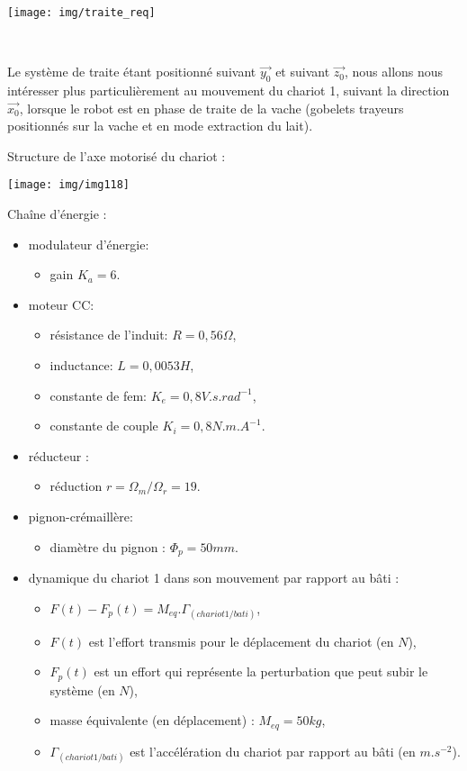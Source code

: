 \begin{center}
 \texttt{[image: img/traite\_req]}
\end{center}

~\

Le système de traite étant positionné suivant $\overrightarrow{y_0}$ et suivant $\overrightarrow{z_0}$, nous allons nous intéresser plus particulièrement au mouvement du chariot 1, suivant la direction $\overrightarrow{x_0}$, lorsque le robot est en phase de traite de la vache (gobelets trayeurs positionnés sur la vache et en mode extraction du lait).

\newpage

Structure de l'axe motorisé du chariot :

\begin{center}
 \texttt{[image: img/img118]}
\end{center}

Chaîne d'énergie :
\begin{itemize}
 \item modulateur d'énergie:
 \begin{itemize}
  \item gain $K_a=6$.
 \end{itemize}
 \item moteur CC:
  \begin{itemize}
  \item résistance de l'induit: $R=0,56\Omega$,
  \item inductance: $L=0,0053 H$,
  \item constante de fem: $K_e=0,8V.s.rad^{-1}$,
  \item constante de couple $K_i=0,8N.m.A^{-1}$.
 \end{itemize}
 \item réducteur :
  \begin{itemize}
  \item réduction $r=\Omega_m/\Omega_r=19$.
  \end{itemize}
 \item pignon-crémaillère:
  \begin{itemize}
  \item diamètre du pignon : $\Phi_p=50mm$.
  \end{itemize}
 \item dynamique du chariot 1 dans son mouvement par rapport au bâti :
  \begin{itemize}
  \item $F(t)-F_p(t)=M_{eq}.\Gamma_{(chariot 1/bati)}$,
  \item $F(t)$ est l'effort transmis pour le déplacement du chariot (en $N$),
  \item $F_p(t)$ est un effort qui représente la perturbation que peut subir le système (en $N$),
  \item masse équivalente (en déplacement) : $M_{eq}=50kg$,
  \item $\Gamma_{(chariot 1/bati)}$ est l'accélération du chariot par rapport au bâti (en $m.s^{-2}$).
  \end{itemize}
\end{itemize}

